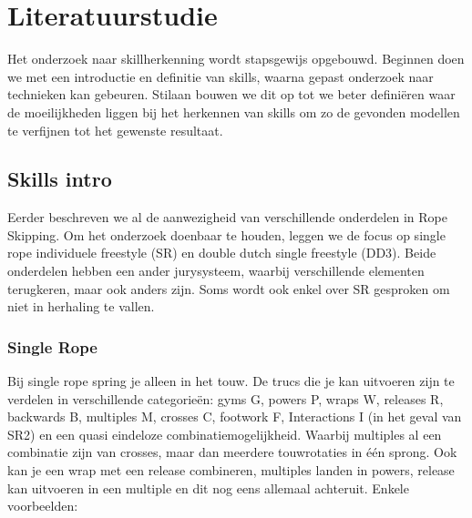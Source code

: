 
\section{Literatuurstudie}%
\label{sec:literatuurstudie}


    
Het onderzoek naar skillherkenning wordt stapsgewijs opgebouwd. Beginnen doen we met een introductie en definitie van skills, waarna gepast onderzoek naar technieken kan gebeuren. Stilaan bouwen we dit op tot we beter definiëren waar de moeilijkheden liggen bij het herkennen van skills om zo de gevonden modellen te verfijnen tot het gewenste resultaat.

\subsection{Skills intro}
\label{subsec:basisskills}

    Eerder beschreven we al de aanwezigheid van verschillende onderdelen in Rope Skipping. Om het onderzoek doenbaar te houden, leggen we de focus op single rope individuele freestyle (SR) en double dutch single freestyle (DD3). Beide onderdelen hebben een ander jurysysteem, waarbij verschillende elementen terugkeren, maar ook anders zijn. Soms wordt ook enkel over SR gesproken om niet in herhaling te vallen.

\subsubsection{Single Rope}

Bij single rope spring je alleen in het touw. De trucs die je kan uitvoeren zijn te verdelen in verschillende categorieën: gyms G, powers P, wraps W, releases R, backwards B, multiples M, crosses C, footwork F, Interactions I (in het geval van SR2) en een quasi eindeloze combinatiemogelijkheid. Waarbij multiples al een combinatie zijn van crosses, maar dan meerdere touwrotaties in één sprong. Ook kan je een wrap met een release combineren, multiples landen in powers, release kan uitvoeren in een multiple en dit nog eens allemaal achteruit.
Enkele voorbeelden:

